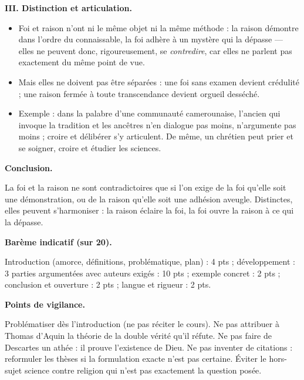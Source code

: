 \documentclass[11pt]{article}
\begin{document}
\begin{corrige}
\textbf{III. Distinction et articulation.}\par
\begin{itemize}
\item Foi et raison n'ont ni le même objet ni la même méthode : la raison démontre dans l'ordre du connaissable, la foi adhère à un mystère qui la dépasse — elles ne peuvent donc, rigoureusement, se \emph{contredire}, car elles ne parlent pas exactement du même point de vue.
\item Mais elles ne doivent pas être séparées : une foi sans examen devient crédulité ; une raison fermée à toute transcendance devient orgueil desséché.
\item Exemple : dans la palabre d'une communauté camerounaise, l'ancien qui invoque la tradition et les ancêtres n'en dialogue pas moins, n'argumente pas moins ; croire et délibérer s'y articulent. De même, un chrétien peut prier et se soigner, croire et étudier les sciences.
\end{itemize}

\textbf{Conclusion.}\par La foi et la raison ne sont contradictoires que si l'on exige de la foi qu'elle soit une démonstration, ou de la raison qu'elle soit une adhésion aveugle. Distinctes, elles peuvent s'harmoniser : la raison éclaire la foi, la foi ouvre la raison à ce qui la dépasse.

\textbf{Barème indicatif (sur 20).}\par Introduction (amorce, définitions, problématique, plan) : 4 pts ; développement : 3 parties argumentées avec auteurs exigés : 10 pts ; exemple concret : 2 pts ; conclusion et ouverture : 2 pts ; langue et rigueur : 2 pts.

\textbf{Points de vigilance.}\par Problématiser dès l'introduction (ne pas réciter le cours). Ne pas attribuer à Thomas d'Aquin la théorie de la \guillemotleft double vérité \guillemotright qu'il réfute. Ne pas faire de Descartes un athée : il prouve l'existence de Dieu. Ne pas inventer de citations : reformuler les thèses si la formulation exacte n'est pas certaine. Éviter le hors-sujet \guillemotleft science contre religion \guillemotright qui n'est pas exactement la question posée.

\end{corrige}
\end{document}
